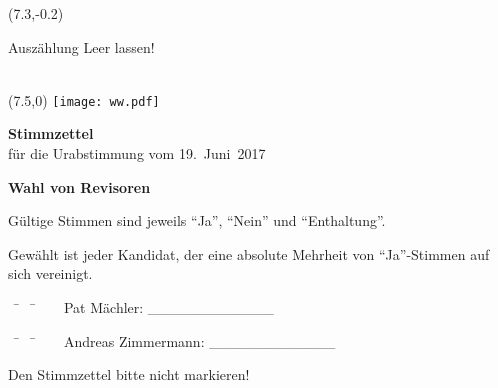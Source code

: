 \documentclass[11pt, a4paper]{scrartcl}
\begin{document}
{\begin{minipage}[t][12.5cm][t]{\textwidth}
\begin{textblock}{6}(7.3,-0.2)
\begin{framed}
Auszählung \hfill Leer lassen! \\
\vspace{1.5cm} ~ \\
\end{framed}
\end{textblock}


\end{minipage}

\newpage

\begin{minipage}[t][12.5cm][t]{\textwidth}

\begin{textblock}{6}(7.5,0)
\texttt{[image: ww.pdf]}
\end{textblock}

{\LARGE\textbf{Stimmzettel}} \\
für die Urabstimmung vom 19.~Juni~2017 \\

\vspace{2cm}


\textbf{Wahl von Revisoren}

Gültige Stimmen sind jeweils \enquote{Ja}, \enquote{Nein} und \enquote{Enthaltung}.

Gewählt ist jeder Kandidat, der eine absolute Mehrheit von \enquote{Ja}-Stimmen auf sich vereinigt.

\vspace{1cm}
\begin{tabbing}
~\hspace{2cm} \= ~\hspace{8cm} \= ~\hspace{2cm} \kill
~\> Pat Mächler:        \> \_\_\_\_\_\_\_\_\_\_\_\_ \\
\end{tabbing}

\vspace{0.1cm}
\begin{tabbing}
~\hspace{2cm} \= ~\hspace{8cm} \= ~\hspace{2cm} \kill
~\> Andreas Zimmermann: \> \_\_\_\_\_\_\_\_\_\_\_\_ \\
\end{tabbing}

\vspace{0.5cm}
Den Stimmzettel bitte nicht markieren!

\end{minipage}


}
\end{document}
